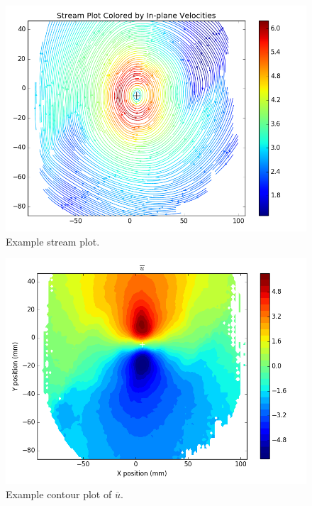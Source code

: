 {\begin{figure}[H]
	\centering
	\includegraphics[width=5in]{figs/example_vortex_figs/example_stream}
	\caption{Example stream plot.}
	\label{fig:examp_stream}
\end{figure}

\begin{figure}[H]
	\centering
	\includegraphics[width=5in]{figs/example_vortex_figs/example_U_contour}
\caption{Example contour plot of $\overline{u}$.}
\label{fig:examp_U}
\end{figure}

}
